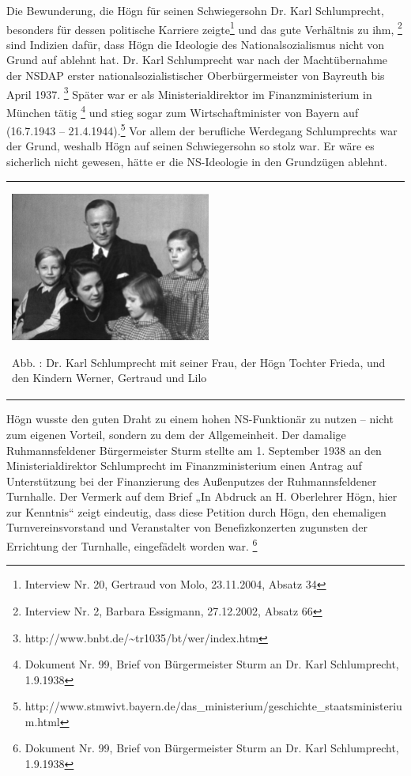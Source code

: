 Die Bewunderung, die Högn für seinen Schwiegersohn Dr. Karl
Schlumprecht, besonders für dessen politische Karriere zeigte\footnote{
Interview Nr. 20, Gertraud von Molo, 23.11.2004, Absatz 34} und das
gute Verhältnis zu ihm, \footnote{Interview Nr. 2, Barbara Essigmann,
27.12.2002, Absatz 66} sind Indizien dafür, dass Högn die Ideologie des
Nationalsozialismus nicht von Grund auf ablehnt hat. Dr. Karl
Schlumprecht war nach der Machtübernahme der NSDAP erster
nationalsozialistischer Oberbürgermeister von Bayreuth bis April
1937. \footnote{http://www.bnbt.de/\~{}tr1035/bt/wer/index.htm} Später
war er als Ministerialdirektor im Finanzministerium in München
tätig \footnote{Dokument Nr. 99, Brief von Bürgermeister Sturm an Dr.
Karl Schlumprecht, 1.9.1938} und stieg sogar zum Wirtschaftminister von
Bayern auf (16.7.1943 – 21.4.1944).\footnote{
http://www.stmwivt.bayern.de/das\_ministerium/geschichte\_staatsministerium.html}
Vor allem der berufliche Werdegang Schlumprechts war der Grund, weshalb
Högn auf seinen Schwiegersohn so stolz war. Er wäre es sicherlich nicht
gewesen, hätte er die NS-Ideologie in den Grundzügen ablehnt.

\begin{center}
\begin{minipage}{6.969cm}
\begin{flushleft}
\tablefirsthead{}
\tablehead{}
\tabletail{}
\tablelasttail{}
\begin{supertabular}{m{6.769cm}}

\includegraphics[width=6.588cm,height=4.888cm]{pictures/zulassungsarbeit-img034.jpg}

Abb. : Dr. Karl Schlumprecht mit seiner Frau,
der Högn Tochter Frieda, und den Kindern Werner, Gertraud und Lilo\\
\end{supertabular}
\end{flushleft}
\end{minipage}
\end{center}
Högn wusste den guten Draht zu einem hohen NS-Funktionär zu nutzen –
nicht zum eigenen Vorteil, sondern zu dem der Allgemeinheit. Der
damalige Ruhmannsfeldener Bürgermeister Sturm stellte am 1. September
1938 an den Ministerialdirektor Schlumprecht im Finanzministerium einen
Antrag auf Unterstützung bei der Finanzierung des Außenputzes der
Ruhmannsfeldener Turnhalle. Der Vermerk auf dem Brief „In Abdruck an H.
Oberlehrer Högn, hier zur Kenntnis“ zeigt eindeutig, dass diese
Petition durch Högn, den ehemaligen Turnvereinsvorstand und
Veranstalter von Benefizkonzerten zugunsten der Errichtung der
Turnhalle, eingefädelt worden war. \footnote{Dokument Nr. 99, Brief von
Bürgermeister Sturm an Dr. Karl Schlumprecht, 1.9.1938}

